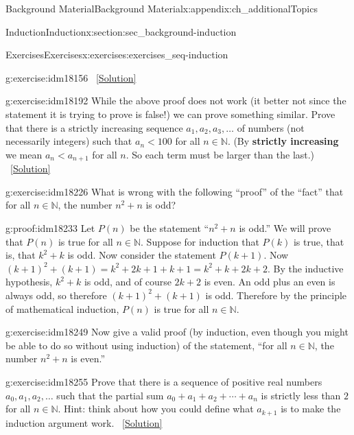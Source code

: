 \documentclass[oneside,10pt,]{book}
\newcommand{\terminology}[1]{\textbf{#1}}
\numberwithin{equation}{chapter}
\def\N{\mathbb N}
\newcommand{\lt}{<}
\begin{document}
\begin{appendixptx}{Background Material}{}{Background Material}{}{}{x:appendix:ch_additionalTopics}
\begin{sectionptx}{Induction}{}{Induction}{}{}{x:section:sec_background-induction}
\begin{exercises-subsection}{Exercises}{}{Exercises}{}{}{x:exercises:exercises_seq-induction}
\begin{divisionexercise}{12}{}{}{g:exercise:idm18156}
\qquad~\hfill{\tiny\hyperlink{g:solution:idm18182-main}{[Solution]}}\end{divisionexercise}%
\begin{divisionexercise}{13}{}{}{g:exercise:idm18192}%
While the above proof does not work (it better not since the statement it is trying to prove is false!) we can prove something similar. Prove that there is a strictly increasing sequence \(a_1, a_2, a_3, \ldots\) of numbers (not necessarily integers) such that \(a_n \lt  100\) for all \(n \in \N\). (By \terminology{strictly increasing} we mean \(a_n \lt  a_{n+1}\) for all \(n\). So each term must be larger than the last.)%
\qquad~\hfill{\tiny\hyperlink{g:solution:idm18201-main}{[Solution]}}\end{divisionexercise}%
\begin{divisionexercise}{14}{}{}{g:exercise:idm18226}%
What is wrong with the following ``proof'' of the ``fact'' that for all \(n \in \N\), the number \(n^2 + n\) is odd?%
\begin{proofptx}{}{g:proof:idm18233}
Let \(P(n)\) be the statement ``\(n^2 + n\) is odd.'' We will prove that \(P(n)\) is true for all \(n \in \N\). Suppose for induction that \(P(k)\) is true, that is, that \(k^2 + k\) is odd. Now consider the statement \(P(k+1)\). Now \((k+1)^2 + (k+1) = k^2 + 2k + 1 + k + 1 = k^2 + k + 2k + 2\). By the inductive hypothesis, \(k^2 + k\) is odd, and of course \(2k + 2\) is even. An odd plus an even is always odd, so therefore \((k+1)^2 + (k+1)\) is odd. Therefore by the principle of mathematical induction, \(P(n)\) is true for all \(n \in \N\).%
\end{proofptx}
\end{divisionexercise}%
\begin{divisionexercise}{15}{}{}{g:exercise:idm18249}%
Now give a valid proof (by induction, even though you might be able to do so without using induction) of the statement, ``for all \(n \in \N\), the number \(n^2 + n\) is even.''%
\end{divisionexercise}%
\begin{divisionexercise}{16}{}{}{g:exercise:idm18255}%
Prove that there is a sequence of positive real numbers \(a_0, a_1, a_2, \ldots\) such that the partial sum \(a_0 + a_1 + a_2 + \cdots + a_n\) is strictly less than \(2\) for all \(n \in \N\). Hint: think about how you could define what \(a_{k+1}\) is to make the induction argument work.%
\qquad~\hfill{\tiny\hyperlink{g:solution:idm18263-main}{[Solution]}}\end{divisionexercise}%

\end{exercises-subsection}
\end{sectionptx}
\end{appendixptx}
\end{document}
